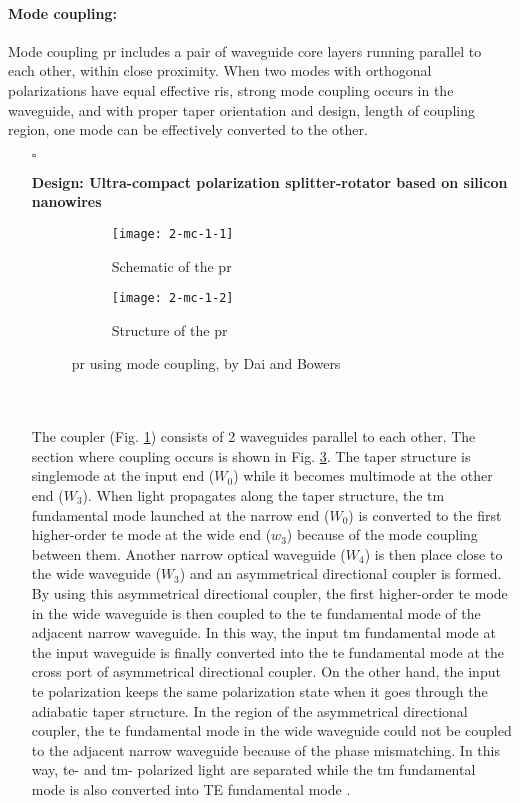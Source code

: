 \documentclass[../report.tex]{subfiles}
\begin{document}
			\paragraph*{Mode coupling:} Mode coupling \gls{pr} includes a pair of waveguide core layers running parallel to each other, within close proximity. When two modes with orthogonal polarizations have equal effective \gls{ri}s, strong mode coupling occurs in the waveguide, and with proper taper orientation and design, length of coupling region, one mode can be effectively converted to the other.
\begin{itemize}[leftmargin=*]
	\item[$\square$] \begin{minipage}[t]{\textwidth}\textbf{Design: Ultra-compact polarization splitter-rotator based on silicon nanowires}
	\begin{figure}[H] %
		\begin{subfigure}[t]{0.45\textwidth}
			\texttt{[image: 2-mc-1-1]}
			\caption{Schematic of the \gls{pr}}
			\label{fig:2_mc_1_1}
		\end{subfigure}
		\hfill
		\begin{subfigure}[t]{0.45\textwidth}
			\texttt{[image: 2-mc-1-2]}
			\caption{Structure of the \gls{pr}}
			\label{fig:2_mc_1_2}
		\end{subfigure}
		\caption{\gls{pr} using mode coupling, by Dai and Bowers \cite{dai_novel_2011}}
	\end{figure}
	\end{minipage}\\\\
	\noindent The coupler (Fig. \ref{fig:2_mc_1_1}) consists of 2 waveguides parallel to each other. The section where coupling occurs is shown in Fig. \ref{fig:2_mc_1_2}. The taper structure is singlemode at the input end ($W_0$) while it becomes multimode at the other end ($W_3$). When light propagates along the taper structure, the \gls{tm} fundamental mode launched at the narrow end ($W_0$) is converted to the first higher-order \gls{te} mode at the wide end ($w_3$) because of the mode coupling between them. Another narrow optical waveguide ($W_4$) is then place close to the wide waveguide ($W_3$) and an asymmetrical directional coupler is formed. By using this asymmetrical directional coupler, the first higher-order \gls{te} mode in the wide waveguide is then coupled to the \gls{te} fundamental mode of the adjacent narrow waveguide. In this way, the input \gls{tm} fundamental mode at the input waveguide is finally converted into the \gls{te} fundamental mode at the cross port of asymmetrical directional coupler. On the other hand, the input \gls{te} polarization keeps the same polarization state when it goes through the adiabatic taper structure. In the region of the asymmetrical directional coupler, the \gls{te} fundamental mode in the wide waveguide could not be coupled to the adjacent narrow waveguide because of the phase mismatching. In this way, \gls{te}- and \gls{tm}- polarized light are separated while the \gls{tm} fundamental mode is also converted into TE fundamental mode \cite{dai_novel_2011}.\par	


\end{itemize}
\end{document}
